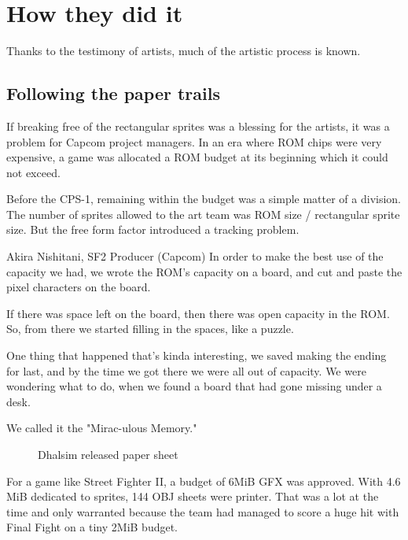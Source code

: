 \pagebreak

\section{How they did it}
Thanks to the testimony of artists, much of the artistic process is known.

\subsection{Following the paper trails}
If breaking free of the rectangular sprites was a blessing for the artists, it was a problem for Capcom project managers. In an era where ROM chips were very expensive, a game was allocated a ROM budget at its beginning which it could not exceed.

Before the CPS-1, remaining within the budget was a simple matter of a division. The number of sprites allowed to the art team was ROM size / rectangular sprite size. But the free form factor introduced a tracking problem.

\begin{q}{Akira Nishitani, SF2 Producer (Capcom)}
In order to make the best use of the capacity we had, we wrote the ROM’s capacity on a board, and cut and paste the pixel characters on the board.

If there was space left on the board, then there was open capacity in the ROM. So, from there we started filling in the spaces, like a puzzle.

One thing that happened that's kinda interesting, we saved making the ending for last, and by the time we got there we were all out of capacity. We were wondering what to do, when we found a board that had gone missing under a desk.

We called it the "Mirac-ulous Memory."
\end{q}



 \begin{figure}[H]
\caption*{Dhalsim released paper sheet}
\end{figure}

For a game like Street Fighter II, a budget of 6MiB GFX was approved. With 4.6 MiB dedicated to sprites, 144 OBJ sheets were printer. That was a lot at the time and only warranted because the team had managed to score a huge hit with Final Fight on a tiny 2MiB budget. 

